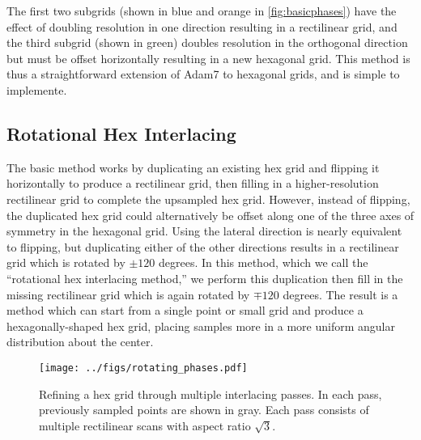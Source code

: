 \documentclass[aip, amsmath, amssymb, nobibnotes, nofootinbib, citeautoscript, reprint, superscriptaddress]{revtex4-1}
\begin{document}


    The first two subgrids (shown in blue and orange in \autoref{fig:basicphases}) have the effect of doubling resolution in one direction
    resulting in a rectilinear grid, and the third subgrid (shown in green) doubles resolution in the orthogonal direction but must be
    offset horizontally resulting in a new hexagonal grid.
    This method is thus a straightforward extension of Adam7 to hexagonal grids, and
    is simple to implemente.


    \subsection{\label{ssec:triple-grid-interlacing}Rotational Hex Interlacing}

    The basic method works by duplicating an existing hex grid and flipping it horizontally to produce a rectilinear grid, then filling in a higher-resolution rectilinear grid to complete the upsampled hex grid.
    However, instead of flipping, the duplicated hex grid could alternatively be offset along one of the three axes of symmetry in the hexagonal grid.
    Using the lateral direction is nearly equivalent to flipping, but duplicating either of the other directions results in a rectilinear grid which is rotated by $\pm 120$ degrees.
    In this method, which we call the ``rotational hex interlacing method,'' we perform this duplication then fill in the missing rectilinear grid which is again rotated by $\mp 120$ degrees.
    The result is a method which can start from a single point or small grid and produce a hexagonally-shaped hex grid, placing samples more in a more uniform angular distribution about the center.



    \begin{figure*}
        \centering
        \texttt{[image: ../figs/rotating\_phases.pdf]}
        \caption{
        \label{fig:rotatingphases} Refining a hex grid through multiple interlacing passes.
        In each pass, previously sampled points are shown in gray.
        Each pass consists of multiple rectilinear scans with aspect ratio $\sqrt{3}$.
        }
    \end{figure*}
\end{document}
